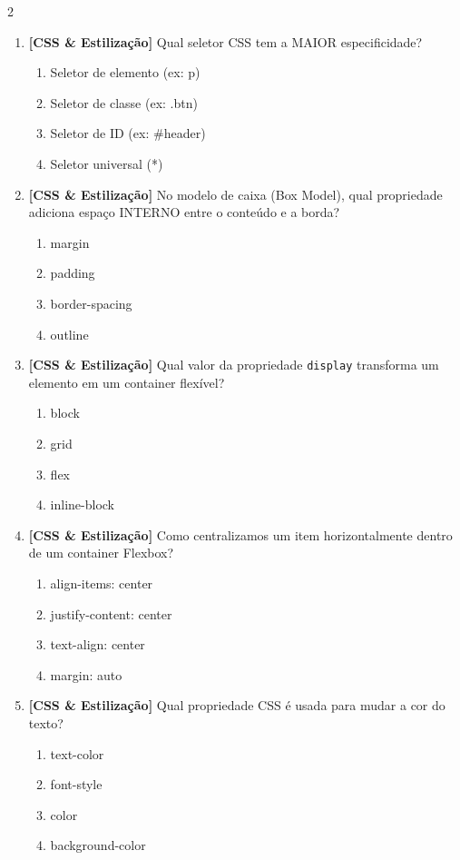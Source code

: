 \documentclass[a4paper,10pt]{article}
\begin{document}
\begin{multicols*}{2}
\begin{enumerate}[label=\textbf{\arabic*.}, resume, leftmargin=*]
\item \textbf{[CSS \& Estilização]} Qual seletor CSS tem a MAIOR especificidade?
\begin{enumerate}[label=(\alph*), noitemsep]
  \item Seletor de elemento (ex: p)
  \item Seletor de classe (ex: .btn)
  \item Seletor de ID (ex: \#header)
  \item Seletor universal (*)
\end{enumerate}

\item \textbf{[CSS \& Estilização]} No modelo de caixa (Box Model), qual propriedade adiciona espaço INTERNO entre o conteúdo e a borda?
\begin{enumerate}[label=(\alph*), noitemsep]
  \item margin
  \item padding
  \item border-spacing
  \item outline
\end{enumerate}

\item \textbf{[CSS \& Estilização]} Qual valor da propriedade \texttt{display} transforma um elemento em um container flexível?
\begin{enumerate}[label=(\alph*), noitemsep]
  \item block
  \item grid
  \item flex
  \item inline-block
\end{enumerate}

\item \textbf{[CSS \& Estilização]} Como centralizamos um item horizontalmente dentro de um container Flexbox?
\begin{enumerate}[label=(\alph*), noitemsep]
  \item align-items: center
  \item justify-content: center
  \item text-align: center
  \item margin: auto
\end{enumerate}

\item \textbf{[CSS \& Estilização]} Qual propriedade CSS é usada para mudar a cor do texto?
\begin{enumerate}[label=(\alph*), noitemsep]
  \item text-color
  \item font-style
  \item color
  \item background-color
\end{enumerate}


\end{enumerate}
\end{multicols*}
\end{document}
